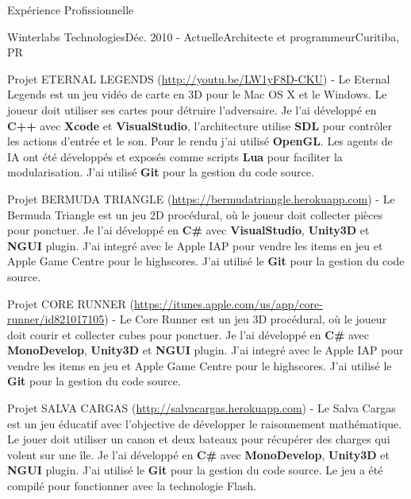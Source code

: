\documentclass{resume}
\begin{document}
  \begin{rSection}{Expérience Profissionnelle}
    \begin{rSubsection}{Winterlabs Technologies}{Déc. 2010 - Actuelle}{Architecte et programmeur}{Curitiba, PR}
    \item Projet ETERNAL LEGENDS (\url{http://youtu.be/LW1yF8D-CKU}) - Le Eternal Legends est un jeu vidéo de carte en 3D pour le Mac OS X et le Windows. Le joueur doit utiliser ses cartes pour détruire l'adversaire. Je l’ai développé en \textbf{C++} avec \textbf{Xcode} et \textbf{VisualStudio}, l’architecture utilise \textbf{SDL} pour contrôler les actions d’entrée et le son. Pour le rendu j’ai utilisé \textbf{OpenGL}. Les agents de IA ont été développés et exposés comme scripts \textbf{Lua} pour faciliter la modularisation. J’ai utilisé \textbf{Git} pour la gestion du code source. \\
    \item Projet BERMUDA TRIANGLE (\url{https://bermudatriangle.herokuapp.com}) - Le Bermuda Triangle est un jeu 2D procédural, où le joueur doit collecter pièces pour ponctuer. Je l'ai développé en \textbf{C\#} avec \textbf{VisualStudio}, \textbf{Unity3D} et \textbf{NGUI} plugin. J'ai integré avec le Apple IAP pour vendre les items en jeu et Apple Game Centre pour le highscores. J'ai utilisé le \textbf{Git} pour la gestion du code source. \\
    \item Projet CORE RUNNER (\url{https://itunes.apple.com/us/app/core-runner/id821017105}) - Le Core Runner est un jeu 3D procédural, où le joueur doit courir et collecter cubes pour ponctuer. Je l'ai développé en \textbf{C\#} avec \textbf{MonoDevelop}, \textbf{Unity3D} et \textbf{NGUI} plugin. J'ai integré avec le Apple IAP pour vendre les items en jeu et Apple Game Centre pour le highscores. J'ai utilisé le \textbf{Git} pour la gestion du code source. \\
    \item Projet SALVA CARGAS (\url{http://salvacargas.herokuapp.com}) - Le Salva Cargas est un jeu éducatif avec l'objective de développer le raisonnement mathématique. Le jouer doit utiliser un canon et deux bateaux pour récupérer des charges qui volent sur une île. Je l'ai développé en \textbf{C\#} avec \textbf{MonoDevelop}, \textbf{Unity3D} et \textbf{NGUI} plugin. J'ai utilisé le \textbf{Git} pour la gestion du code source. Le jeu a été compilé pour fonctionner avec la technologie Flash. \\

\end{rSubsection}
\end{rSection}
\end{document}

